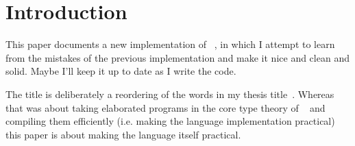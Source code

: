 \section{Introduction}

This paper documents a new implementation of \Idris{}~\cite{plpv11}, in which
I attempt to learn from the mistakes of the previous implementation and make
it nice and clean and solid. Maybe I'll keep it up to date as I write the
code.

The title is deliberately a reordering of the words in my thesis
title~\cite{brady-thesis}. Whereas that was about taking elaborated programs
in the core type theory of \Epigram{}~\cite{view-left} and compiling them
efficiently (i.e. making the language implementation practical) this paper is
about making the language itself practical. 


